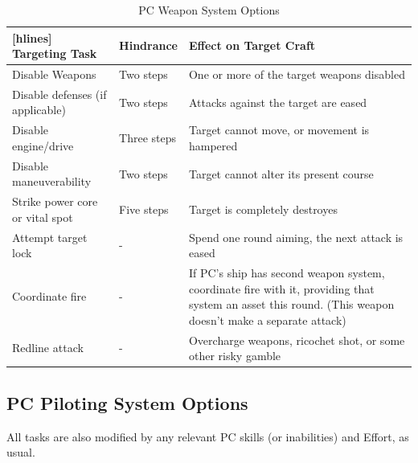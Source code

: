 \begin{table}[h]

\centering

\caption{PC Weapon System Options}
\label{tab:PC Weapon System Options}

\begin{NiceTabular}{ | Y | Y | Y[3] | }[hlines]
\hline
\textbf{Targeting Task} & \textbf{Hindrance}  & \textbf{Effect on Target Craft} \\ \hline
Disable Weapons & Two steps & One or more of the target weapons disabled \\ \hline
Disable defenses (if applicable) & Two steps & Attacks against the target are eased  \\ \hline
Disable engine/drive & Three steps & Target cannot move, or movement is hampered  \\ \hline
Disable maneuverability & Two steps & Target cannot alter its present course \\ \hline
Strike power core or vital spot & Five steps & Target is completely destroyes \\ \hline
Attempt target lock & - & Spend one round aiming, the next attack is eased  \\ \hline
Coordinate fire & - & If PC’s ship has second weapon system, coordinate fire with it, providing that system an asset this round. (This weapon doesn’t make a separate attack) \\ \hline
Redline attack & - & Overcharge weapons, ricochet shot, or some other risky gamble \\ \hline

\end{NiceTabular}
\end{table}

\begin{multicols}{2}

\subsection{PC Piloting System Options}

All tasks are also modified by any relevant PC skills (or inabilities) and Effort, as usual. 

\end{multicols}

\newpage

